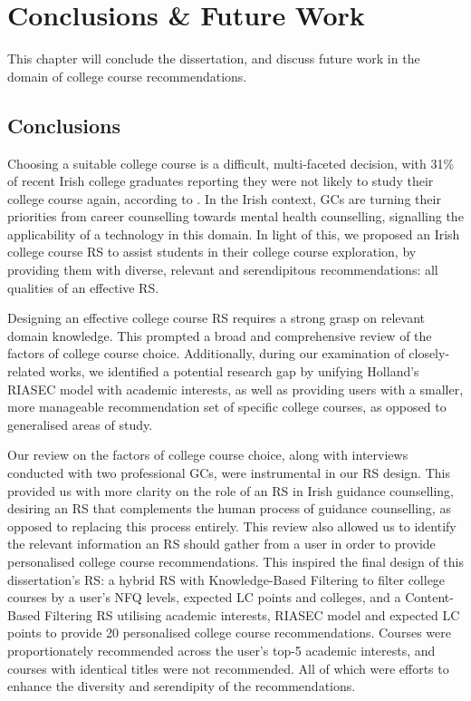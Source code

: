 \chapter{Conclusions \& Future Work}
\label{chap:conclusions}

This chapter will conclude the dissertation, and discuss future work in the domain of college course recommendations.

\section{Conclusions}

Choosing a suitable college course is a difficult, multi-faceted decision,
with 31\% of recent Irish college graduates reporting they were not likely to study their college course again, according to \cite{hea2018graduate}.
In the Irish context, GCs are turning their priorities from career counselling towards mental health counselling,
signalling the applicability of a technology in this domain.
In light of this, we proposed an Irish college course RS to assist students in their college course exploration,
by providing them with diverse, relevant and serendipitous recommendations: all qualities of an effective RS.

Designing an effective college course RS requires a strong grasp on relevant domain knowledge.
This prompted a broad and comprehensive review of the factors of college course choice.
Additionally, during our examination of closely-related works, we identified a potential research gap by unifying Holland's RIASEC model with 
academic interests, as well as providing users with a smaller, more manageable recommendation set of specific college 
courses, as opposed to generalised areas of study.

Our review on the factors of college course choice, along with interviews conducted with two professional GCs, 
were instrumental in our RS design.
This provided us with more clarity on the role of an RS in Irish guidance counselling,
desiring an RS that complements the human process of guidance counselling,
as opposed to replacing this process entirely.
This review also allowed us to identify the relevant information an RS should gather from a 
user in order to provide personalised college course recommendations.
This inspired the final design of this
dissertation's RS: a hybrid RS with Knowledge-Based Filtering to filter college courses by a user's NFQ levels, expected LC points 
and colleges, and a Content-Based Filtering RS utilising academic interests, RIASEC model and expected LC points
to provide 20 personalised college course recommendations.
Courses were proportionately recommended across the user's top-5 academic interests,
and courses with identical titles were not recommended.
All of which were efforts to enhance the diversity and serendipity of the recommendations.

